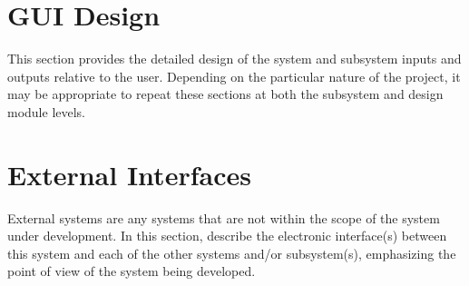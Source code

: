 \section{GUI Design}
This section provides the detailed design of the system and subsystem inputs and outputs relative to the user.  Depending on the particular nature of the project, it may be appropriate to repeat these sections at both the subsystem and design module levels.  

\section{External Interfaces}
External systems are any systems that are not within the scope of the system under development.  In this section, describe the electronic interface(s) between this system and each of the other systems and/or subsystem(s), emphasizing the point of view of the system being developed.


